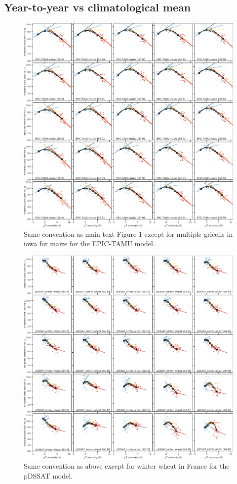 \documentclass[10pt]{article}
\begin{document}
\clearpage
\subsection{Year-to-year vs climatological mean}
\begin{figure}[h!]
\centering
\includegraphics[width=\textwidth]{tempyearvclim_maize_EPIC-TAMU.png}
\caption{Same convention as main text Figure 1 except for multiple gricells in iowa for maize for the EPIC-TAMU model.}
\label{fig:epicmaize}
\end{figure}

\begin{figure}[h!]
\centering
\includegraphics[width=\textwidth]{tempyearvclim_winter_wheat_pDSSAT.png}
\caption{Same convention as above except for winter wheat in France for the pDSSAT model.}
\label{fig:pdssatwwh}
\end{figure}
\end{document}
